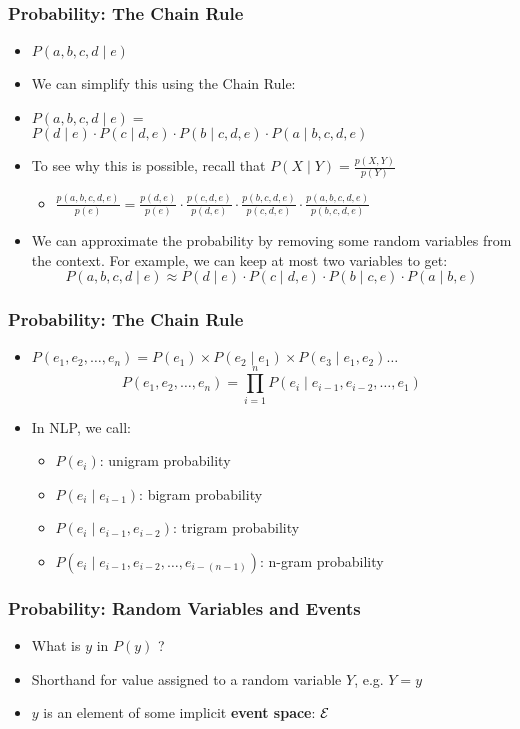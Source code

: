 \begin{frame}
\frametitle{Probability: The Chain Rule}
\begin{itemize}[<+->]
\item $P(a,b,c,d \mid e)$
\item We can simplify this using the Chain Rule:
\item $P(a,b,c,d \mid e) = $\\
$P(d \mid e) \cdot P(c \mid d,e) \cdot P(b \mid c,d,e) \cdot P(a \mid b,c,d,e)$ 
\item To see why this is possible, recall that \( P(X \mid Y) = \frac{p(X,Y)}{p(Y)} \)
\begin{itemize}
\item $\frac{ p(a,b,c,d,e) }{ p(e) } = \frac{p(d,e)}{p(e)} \cdot \frac{p(c,d,e)}{p(d,e)} \cdot \frac{p(b,c,d,e)}{p(c,d,e)} \cdot \frac{p(a,b,c,d,e)}{p(b,c,d,e)} $
\end{itemize}
\item We can approximate the probability by removing some random variables from the context. For example, we can keep at most two variables to get:
\[ P(a,b,c,d \mid e) \approx P(d \mid e) \cdot P(c \mid d, e) \cdot P(b \mid c, e) \cdot P(a \mid b, e) \]
\end{itemize}

\end{frame}

\begin{frame}
\frametitle{Probability: The Chain Rule}
\begin{itemize}[<+->]
\item $P(e_1, e_2, \ldots, e_n) = P(e_1) \times P(e_2 \mid
  e_1) \times P(e_3 \mid e_1, e_2) \ldots $ 
\[ P(e_1, e_2, \ldots, e_n) = \prod^n_{i=1} P(e_i \mid e_{i-1},
  e_{i-2}, \ldots, e_1) \]
\item In NLP, we call:
	\begin{itemize}[<+->]
	\item $P(e_i)$: unigram probability 
	\item $P(e_i \mid e_{i-1})$: bigram probability
	\item $P(e_i \mid e_{i-1}, e_{i-2})$: trigram probability
	\item $P(e_i \mid e_{i-1}, e_{i-2}, \ldots, e_{i-{(n-1)}})$: n-gram probability
	\end{itemize}
\end{itemize}

\end{frame}

\begin{frame}
\frametitle{Probability: Random Variables and Events}
\begin{itemize}[<+->]
\item What is $y$ in $P(y)$ ?
\item Shorthand for value assigned to a random variable $Y$, e.g. $Y = y$
\item $y$ is an element of some implicit {\bf event space}: ${\cal E}$
\end{itemize}

\end{frame}


